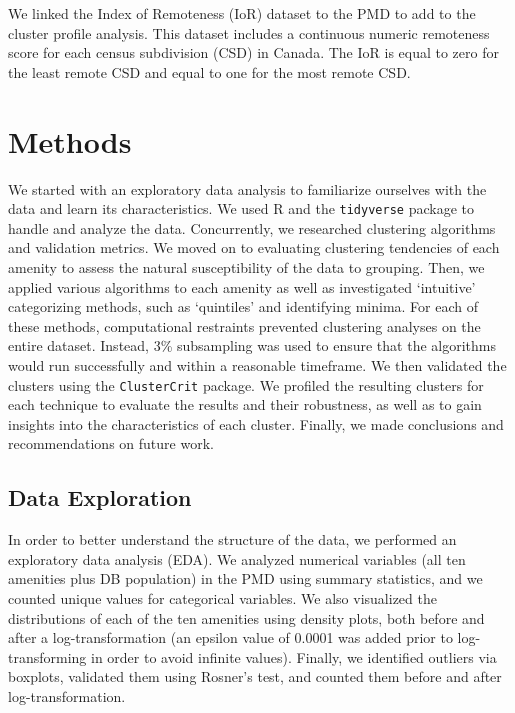 \documentclass[11pt, a4paper]{article}
\begin{document}
We linked the Index of Remoteness (IoR) dataset to the PMD to add to the cluster profile analysis. This dataset includes a continuous numeric remoteness score for each census subdivision (CSD) in Canada. The IoR is equal to zero for the least remote CSD and equal to one for the most remote CSD.









\pagebreak
\section{Methods}

We started with an exploratory data analysis to familiarize ourselves with the data and learn its characteristics. We used R and the \texttt{tidyverse} package to handle and analyze the data. Concurrently, we researched clustering algorithms and validation metrics. We moved on to evaluating clustering tendencies of each amenity to assess the natural susceptibility of the data to grouping. Then, we applied various algorithms to each amenity as well as investigated `intuitive' categorizing methods, such as `quintiles' and identifying minima. For each of these methods, computational restraints prevented clustering analyses on the entire dataset. Instead, 3\% subsampling was used to ensure that the algorithms would run successfully and within a reasonable timeframe. We then validated the clusters using the \texttt{ClusterCrit} package. We profiled the resulting clusters for each technique to evaluate the results and their robustness, as well as to gain insights into the characteristics of each cluster. Finally, we made conclusions and recommendations on future work.







\subsection{Data Exploration}


In order to better understand the structure of the data, we performed an exploratory data analysis (EDA). We analyzed numerical variables (all ten amenities plus DB population) in the PMD using summary statistics, and we counted unique values for categorical variables. We also visualized the distributions of each of the ten amenities using density plots, both before and after a log-transformation (an epsilon value of 0.0001 was added prior to log-transforming in order to avoid infinite values). Finally, we identified outliers via boxplots, validated them using Rosner's test, and counted them before and after log-transformation.
\end{document}
